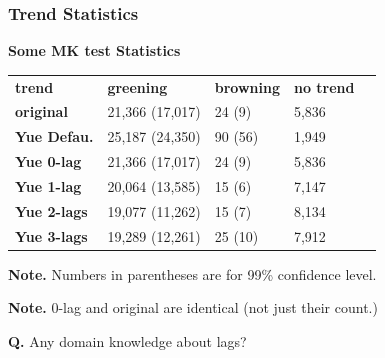 \documentclass[serif, xcolor={dvipsnames}]{beamer} %
\begin{document}
\begin{frame}[t]
\frametitle{Trend Statistics}

{\bf Some MK test Statistics}

\begin{table}[!ht]
\centering
\captionsetup{singlelinecheck=false, format=hang}
\label{tab:Trendcounts}
\begin{tabular}{lllll}
\bottomrule
\rowcolor{cyan} 
{\bf trend} & {\bf greening} & {\bf browning} & {\bf no trend} \\ 
\rowcolor{shadecolor}
\textbf{original}  & 21,366 (17,017) & 24 (9) & 5,836 \\
\textbf{Yue Defau.}  &  25,187 (24,350) & 90 (56) & 1,949 \\
\rowcolor{shadecolor}
\textbf{Yue 0-lag}  & 21,366 (17,017) & 24 (9) & 5,836 \\
\textbf{Yue 1-lag}  &  20,064 (13,585) & 15 (6) &  7,147 \\
\textbf{Yue 2-lags}  & 19,077 (11,262) &  15 (7) & 8,134 \\
\textbf{Yue 3-lags}  & 19,289 (12,261) & 25 (10) & 7,912 \\
\toprule
\end{tabular}
\end{table}
\begin{tcolorbox}
{\scriptsize{\bf Note.} Numbers in parentheses are for 99\% confidence level.
}


{\scriptsize{\bf Note.} 0-lag and original are identical (not just their count.)
}

{\scriptsize{\bf \color{red}Q.} Any domain knowledge about lags?}

\end{tcolorbox}
\end{frame}

\end{document}
